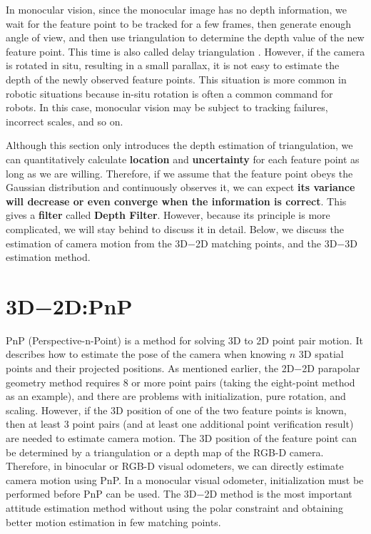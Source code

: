 In monocular vision, since the monocular image has no depth information, we wait for the feature point to be tracked for a few frames, then generate enough angle of view, and then use triangulation to determine the depth value of the new feature point. This time is also called delay triangulation \textsuperscript{\cite{Davison2003}}. However, if the camera is rotated in situ, resulting in a small parallax, it is not easy to estimate the depth of the newly observed feature points. This situation is more common in robotic situations because in-situ rotation is often a common command for robots. In this case, monocular vision may be subject to tracking failures, incorrect scales, and so on.

Although this section only introduces the depth estimation of triangulation, we can quantitatively calculate \textbf{location} and \textbf{uncertainty} for each feature point as long as we are willing. Therefore, if we assume that the feature point obeys the Gaussian distribution and continuously observes it, we can expect \textbf{its variance will decrease or even converge when the information is correct}. This gives a \textbf{filter} called \textbf{Depth Filter}. However, because its principle is more complicated, we will stay behind to discuss it in detail. Below, we discuss the estimation of camera motion from the 3D−2D matching points, and the 3D−3D estimation method.

\section{3D−2D:PnP}
PnP (Perspective-n-Point) is a method for solving 3D to 2D point pair motion. It describes how to estimate the pose of the camera when knowing $n$ 3D spatial points and their projected positions. As mentioned earlier, the 2D−2D parapolar geometry method requires 8 or more point pairs (taking the eight-point method as an example), and there are problems with initialization, pure rotation, and scaling. However, if the 3D position of one of the two feature points is known, then at least 3 point pairs (and at least one additional point verification result) are needed to estimate camera motion. The 3D position of the feature point can be determined by a triangulation or a depth map of the RGB-D camera. Therefore, in binocular or RGB-D visual odometers, we can directly estimate camera motion using PnP. In a monocular visual odometer, initialization must be performed before PnP can be used. The 3D−2D method is the most important attitude estimation method without using the polar constraint and obtaining better motion estimation in few matching points.

